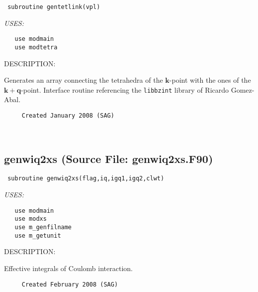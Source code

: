 \documentclass[11pt]{article}
\begin{document}
\begin{verbatim} subroutine gentetlink(vpl)\end{verbatim}{\em USES:}
\begin{verbatim}   use modmain
   use modtetra\end{verbatim}
{\sf DESCRIPTION:\\ }


     Generates an array connecting the tetrahedra of the $\mathbf{k}$-point with
     the ones of the  $\mathbf{k}+\mathbf{q}$-point. Interface routine
     referencing the {\tt libbzint} library of Ricardo Gomez-Abal.
  
\begin{verbatim}     Created January 2008 (SAG)\end{verbatim}






 
 
\mbox{}\hrulefill\ 
 
\subsection{genwiq2xs (Source File: genwiq2xs.F90)}


\begin{verbatim} subroutine genwiq2xs(flag,iq,igq1,igq2,clwt)\end{verbatim}{\em USES:}
\begin{verbatim}   use modmain
   use modxs
   use m_genfilname
   use m_getunit\end{verbatim}
{\sf DESCRIPTION:\\ }


     Effective integrals of Coulomb interaction.
  
\begin{verbatim}     Created February 2008 (SAG)\end{verbatim}


 
 
\end{document}
